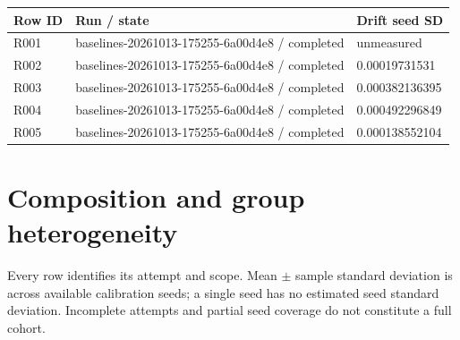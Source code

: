 \documentclass[10pt]{article}
\begin{document}
{\scriptsize\setlength{\tabcolsep}{2pt}
\begin{longtable}{p{}p{}p{}}
Row ID & Run / state & Drift seed SD \\
\hline\endhead
R001 & baselines-20261013-175255-6a00d4e8 / completed & unmeasured \\
R002 & baselines-20261013-175255-6a00d4e8 / completed & 0.00019731531 \\
R003 & baselines-20261013-175255-6a00d4e8 / completed & 0.000382136395 \\
R004 & baselines-20261013-175255-6a00d4e8 / completed & 0.000492296849 \\
R005 & baselines-20261013-175255-6a00d4e8 / completed & 0.000138552104 \\
\end{longtable}}

\section{Composition and group heterogeneity}

Every row identifies its attempt and scope. Mean \(\pm\) sample standard deviation is across available calibration seeds; a single seed has no estimated seed standard deviation. Incomplete attempts and partial seed coverage do not constitute a full cohort.
\end{document}
